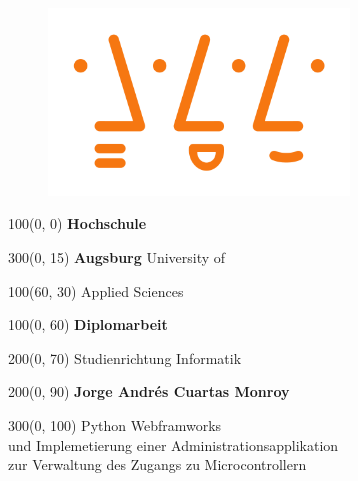 \begin{titlepage}
\begin{figure}[htb]
\centering
\includegraphics[width=8cm]{images/hsaugsburglogo.png}
\label{Logo}
\end{figure}

\setlength{\TPHorizModule}{1mm}
\setlength{\TPVertModule}{1mm}


\begin{textblock}{100}(0, 0)
\fontsize{60}{15}
\selectfont
\textbf{Hochschule} 
\end{textblock}

\begin{textblock}{300}(0, 15)
\fontsize{50}{15}
\selectfont
\textbf{Augsburg} University of 
\end{textblock}

\begin{textblock}{100}(60, 30)
\fontsize{50}{15}
\selectfont
Applied Sciences 
\end{textblock}

\begin{textblock}{100}(0, 60)
\fontsize{30}{15}
\selectfont 
\textbf{Diplomarbeit} 
\end{textblock}

\begin{textblock}{200}(0, 70)
\fontsize{20}{15}
\selectfont 
Studienrichtung Informatik 
\end{textblock}

\begin{textblock}{200}(0, 90)
\fontsize{20}{15}
\selectfont 
\textbf{Jorge Andrés Cuartas Monroy}
\end{textblock}

\begin{textblock}{300}(0, 100)
\fontsize{20}{15}
\selectfont 
Python Webframworks\\
und Implemetierung einer Administrationsapplikation\\
zur Verwaltung des Zugangs zu Microcontrollern
\end{textblock}
\end{titlepage}